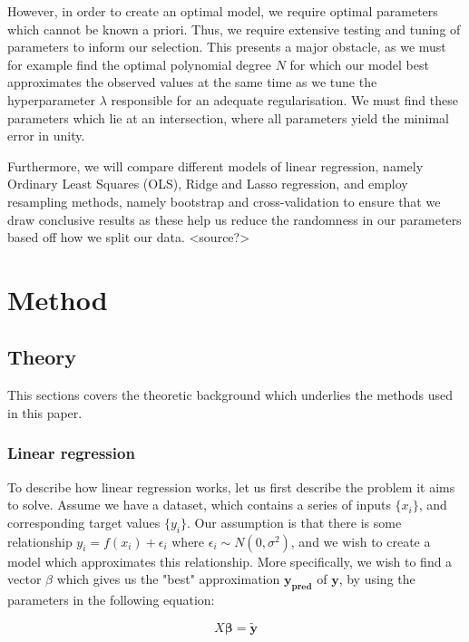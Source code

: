 \documentclass[twocolumn,10pt,cleanfoot]{asme2ej}
\begin{document}
However, in order to create an optimal model, we require optimal parameters which cannot be known a priori. Thus, we require extensive testing and tuning of parameters to inform our selection. This presents a major obstacle, as we must for example find the optimal polynomial degree $N$ for which our model best approximates the observed values at the same time as we tune the hyperparameter $\lambda$ responsible for an adequate regularisation. We must find these parameters which lie at an intersection, where all parameters yield the minimal error in unity.

Furthermore, we will compare different models of linear regression, namely Ordinary Least Squares (OLS), Ridge and Lasso regression, and employ resampling methods, namely bootstrap and cross-validation to ensure that we draw conclusive results as these help us reduce the randomness in our parameters based off how we split our data. <source?>




\section{Method}

\subsection{Theory}

This sections covers the theoretic background which underlies the methods used in this paper.

\subsubsection{Linear regression}

To describe how linear regression works, let us first describe the problem it aims to solve. Assume we have a dataset, which contains a series of inputs $\{x_i\}$, and corresponding target values $\{y_i\}$. Our assumption is that there is some relationship $y_i = f(x_i) + \epsilon_i$ where $\epsilon_i \sim N(0,\sigma^2)$, and we wish to create a model which approximates this relationship. More specifically, we wish to find a vector $\beta$ which gives us the "best" approximation $\bm{y_{pred}}$ of $\bm{y}$, by using the parameters in the following equation:

\begin{equation}
X \bm{\beta} = \bm{\tilde{y}}
\end{equation}
\end{document}
